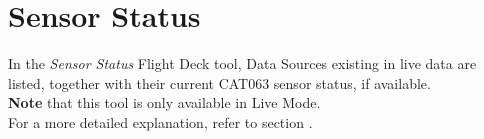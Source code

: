 \section{Sensor Status}
\label{sec:sensor_status}

In the \textit{Sensor Status} Flight Deck tool, Data Sources existing in live data are listed,
together with their current CAT063 sensor status, if available. \\

\textbf{Note} that this tool is only available in Live Mode. \\

For a more detailed explanation, refer to section .
